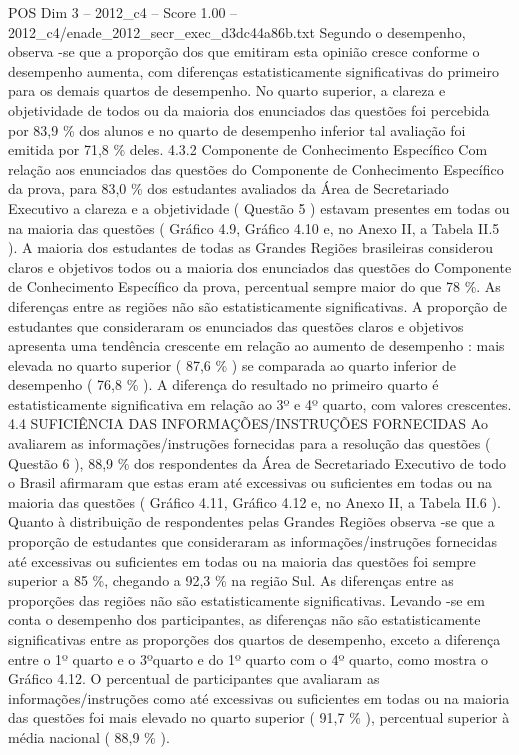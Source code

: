 \begin{textsample}{POS Dim 3 – 2012\_c4 – Score 1.00 – 2012\_c4/enade\_2012\_secr\_exec\_d3dc44a86b.txt}
Segundo o desempenho, observa -se que a proporção dos que emitiram esta opinião cresce conforme o desempenho aumenta, com diferenças estatisticamente significativas do primeiro para os demais quartos de desempenho.
No quarto superior, a clareza e objetividade de todos ou da maioria dos enunciados das questões foi percebida por 83,9 \% dos alunos e no quarto de desempenho inferior tal avaliação foi emitida por 71,8 \% deles. 4.3.2 Componente de Conhecimento Específico Com relação aos enunciados das questões do Componente de Conhecimento Específico da prova, para 83,0 \% dos estudantes avaliados da Área de Secretariado Executivo a clareza e a objetividade ( Questão 5 ) estavam presentes em todas ou na maioria das questões ( Gráfico 4.9, Gráfico 4.10 e, no Anexo II, a Tabela II.5 ).
A maioria dos estudantes de todas as Grandes Regiões brasileiras considerou claros e objetivos todos ou a maioria dos enunciados das questões do Componente de Conhecimento Específico da prova, percentual sempre maior do que 78 \%.
As diferenças entre as regiões não são estatisticamente significativas.
A proporção de estudantes que consideraram os enunciados das questões claros e objetivos apresenta uma tendência crescente em relação ao aumento de desempenho : mais elevada no quarto superior ( 87,6 \% ) se comparada ao quarto inferior de desempenho ( 76,8 \% ).
A diferença do resultado no primeiro quarto é estatisticamente significativa em relação ao 3º e 4º quarto, com valores crescentes. 4.4 SUFICIÊNCIA DAS INFORMAÇÕES/INSTRUÇÕES FORNECIDAS Ao avaliarem as informações/instruções fornecidas para a resolução das questões ( Questão 6 ), 88,9 \% dos respondentes da Área de Secretariado Executivo de todo o Brasil afirmaram que estas eram até excessivas ou suficientes em todas ou na maioria das questões ( Gráfico 4.11, Gráfico 4.12 e, no Anexo II, a Tabela II.6 ).
Quanto à distribuição de respondentes pelas Grandes Regiões observa -se que a proporção de estudantes que consideraram as informações/instruções fornecidas até excessivas ou suficientes em todas ou na maioria das questões foi sempre superior a 85 \%, chegando a 92,3 \% na região Sul.
As diferenças entre as proporções das regiões não são estatisticamente significativas.
Levando -se em conta o desempenho dos participantes, as diferenças não são estatisticamente significativas entre as proporções dos quartos de desempenho, exceto a diferença entre o 1º quarto e o 3ºquarto e do 1º quarto com o 4º quarto, como mostra o Gráfico 4.12.
O percentual de participantes que avaliaram as informações/instruções como até excessivas ou suficientes em todas ou na maioria das questões foi mais elevado no quarto superior ( 91,7 \% ), percentual superior à média nacional ( 88,9 \% ).

\end{textsample}
